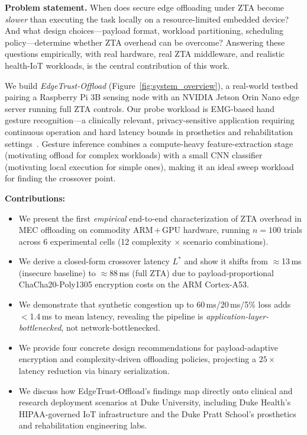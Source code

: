 \documentclass[10pt,twocolumn]{article}
\begin{document}
\textbf{Problem statement.}  When does secure edge offloading under ZTA
become \emph{slower} than executing the task locally on a resource-limited
embedded device?  And what design choices—payload format, workload
partitioning, scheduling policy—determine whether ZTA overhead can be
overcome?  Answering these questions empirically, with real hardware, real ZTA
middleware, and realistic health-IoT workloads, is the central contribution
of this work.

We build \emph{EdgeTrust-Offload}
(Figure~\ref{fig:system_overview}), a real-world testbed pairing a Raspberry
Pi 3B sensing node with an NVIDIA Jetson Orin Nano edge server running full
ZTA controls.  Our probe workload is EMG-based hand gesture recognition—a
clinically relevant, privacy-sensitive application requiring continuous
operation and hard latency bounds in prosthetics and rehabilitation
settings~\cite{zanghieri2019tcn, moin2020wearable}.  Gesture inference
combines a compute-heavy feature-extraction stage (motivating offload for
complex workloads) with a small CNN classifier (motivating local execution for
simple ones), making it an ideal sweep workload for finding the crossover
point.


\textbf{Contributions:}

\begin{itemize}[leftmargin=1.2em]
    \item We present the first \emph{empirical} end-to-end characterization of
          ZTA overhead in MEC offloading on commodity ARM\,+\,GPU hardware,
          running $n=100$ trials across 6 experimental cells (12 complexity
          $\times$ scenario combinations).
    \item We derive a closed-form crossover latency $L^*$ and show it shifts
          from $\approx$13\,ms (insecure baseline) to $\approx$88\,ms (full
          ZTA) due to payload-proportional ChaCha20-Poly1305 encryption costs
          on the ARM Cortex-A53.
    \item We demonstrate that synthetic congestion up to 60\,ms/20\,ms/5\%
          loss adds $<$1.4\,ms to mean latency, revealing the pipeline is
          \emph{application-layer-bottlenecked}, not network-bottlenecked.
    \item We provide four concrete design recommendations for payload-adaptive
          encryption and complexity-driven offloading policies, projecting a
          $25\times$ latency reduction via binary serialization.
    \item We discuss how EdgeTrust-Offload's findings map directly onto
          clinical and research deployment scenarios at Duke University,
          including Duke Health's HIPAA-governed IoT infrastructure and the
          Duke Pratt School's prosthetics and rehabilitation engineering labs.
\end{itemize}
\end{document}
